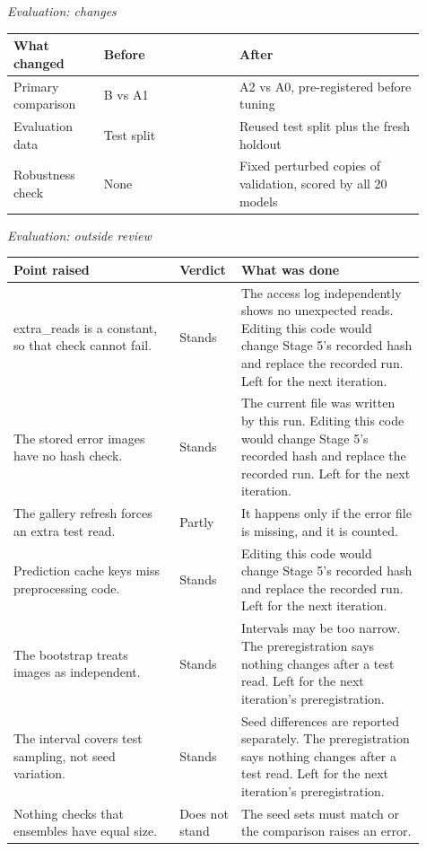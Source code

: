 \textit{Evaluation: changes}

\begin{tabular}{p{0.20\linewidth}p{0.30\linewidth}p{0.41\linewidth}}
\toprule
What changed & Before & After \\
\midrule
Primary comparison & B vs A1 & A2 vs A0, pre-registered before tuning \\
Evaluation data & Test split & Reused test split plus the fresh holdout \\
Robustness check & None & Fixed perturbed copies of validation, scored by all 20 models \\
\bottomrule
\end{tabular}

\medskip

\textit{Evaluation: outside review}

\begin{tabular}{p{0.38\linewidth}p{0.11\linewidth}p{0.42\linewidth}}
\toprule
Point raised & Verdict & What was done \\
\midrule
extra\_reads is a constant, so that check cannot fail. & Stands & The access log independently shows no unexpected reads. Editing this code would change Stage 5's recorded hash and replace the recorded run. Left for the next iteration. \\
The stored error images have no hash check. & Stands & The current file was written by this run. Editing this code would change Stage 5's recorded hash and replace the recorded run. Left for the next iteration. \\
The gallery refresh forces an extra test read. & Partly & It happens only if the error file is missing, and it is counted. \\
Prediction cache keys miss preprocessing code. & Stands & Editing this code would change Stage 5's recorded hash and replace the recorded run. Left for the next iteration. \\
The bootstrap treats images as independent. & Stands & Intervals may be too narrow. The preregistration says nothing changes after a test read. Left for the next iteration's preregistration. \\
The interval covers test sampling, not seed variation. & Stands & Seed differences are reported separately. The preregistration says nothing changes after a test read. Left for the next iteration's preregistration. \\
Nothing checks that ensembles have equal size. & Does not stand & The seed sets must match or the comparison raises an error. \\

\end{tabular}
